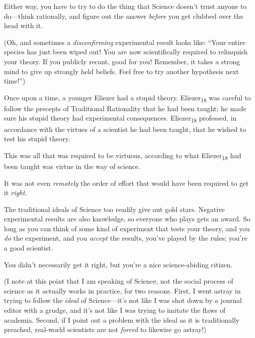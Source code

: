 {
 Either way, you have to try to do the thing that Science
doesn't trust anyone to do---think rationally, and
figure out the answer \textit{before} you get clubbed over the head
with it.}

{
 (Oh, and sometimes a \textit{disconfirming} experimental result
looks like: ``Your entire species has just been wiped
out! You are now scientifically required to relinquish your theory. If
you publicly recant, good for you! Remember, it takes a strong mind to
give up strongly held beliefs. Feel free to try another hypothesis next
time!'')}

\myendsectiontext


\bigskip


{
 Once upon a time, a younger Eliezer had a stupid theory.
Eliezer\textsubscript{18} was careful to follow the precepts of
Traditional Rationality that he had been taught; he made sure his
stupid theory had experimental consequences. Eliezer\textsubscript{18}
professed, in accordance with the virtues of a scientist he had been
taught, that he wished to test his stupid theory. }

{
 This was all that was required to be virtuous, according to what
Eliezer\textsubscript{18} had been taught was virtue in the way of
science.}

{
 It was not even \textit{remotely} the order of effort that would
have been required to get it \textit{right}.}

{
 The traditional ideals of Science too readily give out gold stars.
Negative experimental results are also knowledge, so everyone who plays
gets an award. So long as you can think of some kind of experiment that
tests your theory, and you \textit{do} the experiment, and you
\textit{accept} the results, you've played by the
rules; you're a good scientist.}

{
 You didn't necessarily get it right, but
you're a nice science-abiding citizen.}

{
 (I note at this point that I am speaking of Science, not the
social process of science as it actually works in practice, for two
reasons. First, I went astray in trying to follow the \textit{ideal} of
Science---it's not like I was shot down by a journal
editor with a grudge, and it's not like I was trying to
imitate the flaws of academia. Second, if I point out a problem with
the ideal as it is traditionally preached, real-world scientists are
not \textit{forced} to likewise go astray!)}

